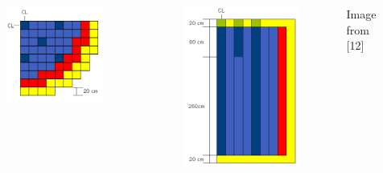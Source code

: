 \documentclass{beamer}
\begin{document}
\begin{frame}[fragile]
\begin{columns}[c]
\begin{figure}
\includegraphics[width=0.7\linewidth]{iaea1.png}
\end{figure}
\begin{figure}
\includegraphics[width=0.7\linewidth]{iaea2.png}
\end{figure}
Image from [12]
\end{columns}
\end{frame}
\end{document}
